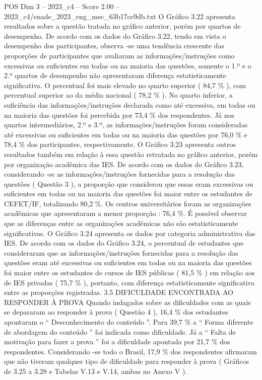 \begin{textsample}{POS Dim 3 – 2023\_c4 – Score 2.00 – 2023\_c4/enade\_2023\_eng\_mec\_63b17ce9db.txt}
O Gráfico 3.22 apresenta resultados sobre a questão tratada no gráfico anterior, porém por quartos de desempenho.
De acordo com os dados do Gráfico 3.22, tendo em vista o desempenho dos participantes, observa -se uma tendência crescente das proporções de participantes que avaliaram as informações/instruções como excessivas ou suficientes em todas ou na maioria das questões, somente o 1.º e o 2.º quartos de desempenho não apresentaram diferença estatisticamente significativa.
O percentual foi mais elevado no quarto superior ( 84,7 \% ), com percentual superior ao da média nacional ( 78,2 \% ).
No quarto inferior, a suficiência das informações/instruções declarada como até excessiva, em todas ou na maioria das questões foi percebida por 73,4 \% dos respondentes.
Já nos quartos intermediários, 2.º e 3.º, as informações/instruções foram consideradas até excessivas ou suficientes em todas ou na maioria das questões por 76,0 \% e 78,4 \% dos participantes, respectivamente.
O Gráfico 3.23 apresenta outros resultados também em relação à essa questão retratada no gráfico anterior, porém por organização acadêmica das IES.
De acordo com os dados do Gráfico 3.23, considerando -se as informações/instruções fornecidas para a resolução das questões ( Questão 3 ), a proporção que considerou que essas eram excessivas ou suficientes em todas ou na maioria das questões foi maior entre os estudantes de CEFET/IF, totalizando 80,2 \%.
Os centros universitários foram as organizações acadêmicas que apresentaram a menor proporção : 76,4 \%.
É possível observar que as diferenças entre as organizações acadêmicas não são estatisticamente significativas.
O Gráfico 3.24 apresenta os dados por categoria administrativa das IES.
De acordo com os dados do Gráfico 3.24, o percentual de estudantes que consideraram que as informações/instruções fornecidas para a resolução das questões eram até excessivas ou suficientes em todas ou na maioria das questões foi maior entre os estudantes de cursos de IES públicas ( 81,5 \% ) em relação aos de IES privadas ( 75,7 \% ), portanto, com diferença estatisticamente significativa entre as proporções registradas. 3.5 DIFICULDADE ENCONTRADA AO RESPONDER À PROVA Quando indagados sobre as dificuldades com as quais se depararam ao responder à prova ( Questão 4 ), 16,4 \% dos estudantes apontaram o “ Desconhecimento do conteúdo ”.
Para 39,7 \% a “ Forma diferente de abordagem do conteúdo ” foi indicada como dificuldade.
Já a “ Falta de motivação para fazer a prova ” foi a dificuldade apontada por 21,7 \% dos respondentes.
Considerando -se todo o Brasil, 17,9 \% dos respondentes afirmaram que não tiveram qualquer tipo de dificuldade para responder à prova ( Gráficos de 3.25 a 3.28 e Tabelas V.13 e V.14, ambas no Anexo V ).

\end{textsample}
